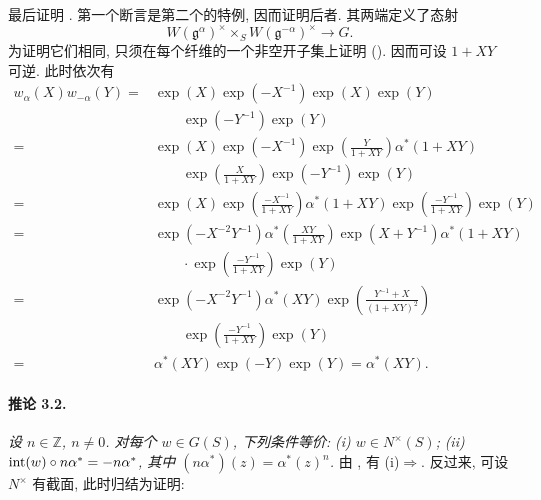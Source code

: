 最后证明 \textup{}. 第一个断言是第二个的特例, 因而证明后者. 其两端定义了态射
\[
  W(\mathfrak g^\alpha)^\times
    \times_S W(\mathfrak g^{-\alpha})^\times
  \longrightarrow G.
\]
为证明它们相同, 只须在每个纤维的一个非空开子集上证明 \textup{()}. 因而可设 \(1+XY\) 可逆. 此时依次有
\[
\begin{aligned}
  w_\alpha(X)w_{-\alpha}(Y)
    ={}&\exp(X)\exp(-X^{-1})\exp(X)
        \exp(Y)\\
       &\qquad{}\exp(-Y^{-1})\exp(Y)\\
    ={}&\exp(X)\exp(-X^{-1})
        \exp\left(\frac{Y}{1+XY}\right)
        \alpha^\ast(1+XY)\\
       &\qquad{}
        \exp\left(\frac{X}{1+XY}\right)
        \exp(-Y^{-1})\exp(Y)\\
    ={}&\exp(X)
        \exp\left(\frac{-X^{-1}}{1+XY}\right)
        \alpha^\ast(1+XY)
        \exp\left(\frac{-Y^{-1}}{1+XY}\right)\exp(Y)\\
    ={}&\exp(-X^{-2}Y^{-1})
        \alpha^\ast\left(\frac{XY}{1+XY}\right)
        \exp(X+Y^{-1})\alpha^\ast(1+XY)\\
       &{}\qquad\cdot
        \exp\left(\frac{-Y^{-1}}{1+XY}\right)\exp(Y)\\
    ={}&\exp(-X^{-2}Y^{-1})\alpha^\ast(XY)
        \exp\left(\frac{Y^{-1}+X}{(1+XY)^2}\right)\\
       &\qquad{}
        \exp\left(\frac{-Y^{-1}}{1+XY}\right)\exp(Y)\\
    ={}&\alpha^\ast(XY)\exp(-Y)\exp(Y)
        =\alpha^\ast(XY).
\end{aligned}
\]

\paragraph{\textbf{推论 3.2.}}
\emph{设 \(n\in\mathbb Z\), \(n\ne0\). 对每个 \(w\in G(S)\), 下列条件等价:}
\smallskip
\noindent\emph{\textup{(i)} \(w\in N^\times(S)\);}
\smallskip
\noindent\emph{\textup{(ii)} \(\operatorname{int}(w)\circ n\alpha^\ast=-n\alpha^\ast\), 其中 \((n\alpha^\ast)(z)=\alpha^\ast(z)^n\).}
\smallskip
由 \textup{}, 有 \textup{(i)}\(\Rightarrow\)\textup{}. 反过来, 可设 \(N^\times\) 有截面, 此时归结为证明:

